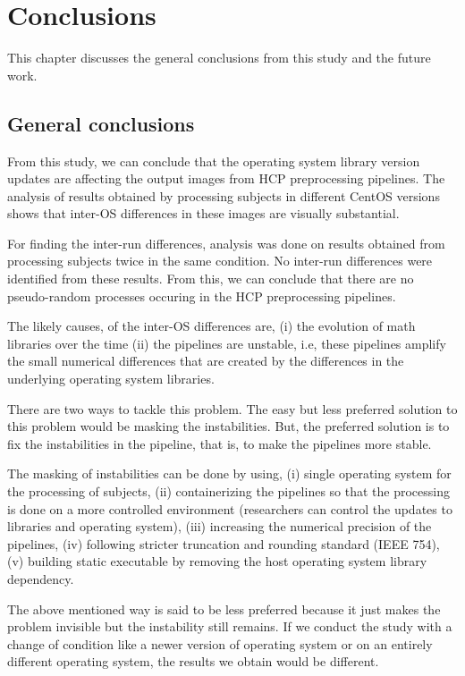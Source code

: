 \chapter{Conclusions}\label{conclusion}
This chapter discusses the general conclusions from this study and the future work.

\section{General conclusions}
From this study, we can conclude that the operating system library 
version updates are affecting the output images from HCP preprocessing 
pipelines. The analysis of results obtained by processing subjects in 
different CentOS versions shows that inter-OS differences in these 
images are visually substantial.

For finding the inter-run differences, analysis was done on results 
obtained from processing subjects twice in the same condition. No 
inter-run differences were identified from these results. From this, we 
can conclude that there are no pseudo-random processes occuring in the HCP preprocessing pipelines.

The likely causes, of the inter-OS differences are, (i) the evolution 
of math libraries over the time (ii) the pipelines are unstable, i.e, 
these pipelines amplify the small numerical differences that are 
created by the differences in the underlying operating system 
libraries.

There are two ways to tackle this problem. The easy but less preferred 
solution to this problem would be masking the instabilities. But, the 
preferred solution is to fix the instabilities in the pipeline, that 
is, to make the pipelines more stable.

The masking of instabilities can be done by using, (i) single operating 
system for the processing of subjects, (ii) containerizing the 
pipelines so that the processing is done on a more controlled 
environment (researchers can control the updates to libraries and 
operating system), (iii) increasing the numerical precision of the 
pipelines, (iv) following stricter truncation and rounding standard 
(IEEE 754), (v) building static executable by removing the host 
operating system library dependency.

The above mentioned way is said to be less preferred because it just 
makes the problem invisible but the instability still remains. If we 
conduct the study with a change of condition like a newer version of 
operating system or on an entirely different operating system, the 
results we obtain would be different.

